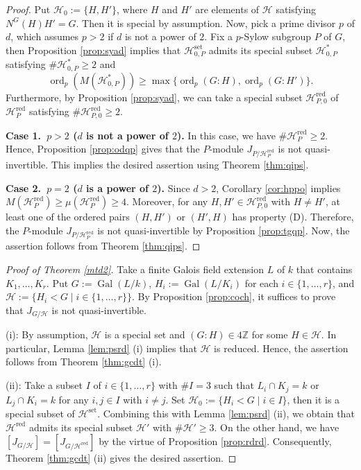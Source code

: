 \documentclass[12pt]{amsart}
\theoremstyle{plain}
\theoremstyle{definition}
\numberwithin{thm}{section}
\numberwithin{equation}{section}
\newcommand{\Z}{\mathbb{Z}}
\newcommand{\cH}{\mathcal{H}}
\DeclareMathOperator{\ord}{ord}
\DeclareMathOperator{\Gal}{Gal}
\DeclareMathOperator{\red}{red}
\DeclareMathOperator{\set}{set}
\begin{document}

\begin{proof}
Put $\cH_{0}:=\{H,H'\}$, where $H$ and $H'$ are elements of $\cH$ satisfying $N^{G}(H)H'=G$. Then it is special by assumption. Now, pick a prime divisor $p$ of $d$, which assumes $p>2$ if $d$ is not a power of $2$. Fix a $p$-Sylow subgroup $P$ of $G$, then Proposition \ref{prop:syad} implies that $\cH_{0,P}^{\set}$ admits its special subset $\cH_{0,P}^{\ast}$ satisfying $\#\cH_{0,P}^{\ast}\geq 2$ and 
\begin{equation*}
    \ord_{p}(M(\cH_{0,P}^{\ast}))\geq \max\{\ord_{p}(G:H),\ord_{p}(G:H')\}. 
\end{equation*}
Furthermore, by Proposition \ref{prop:syad}, we can take a special subset $\cH_{P,0}^{\red}$ of $\cH_{P}^{\red}$ satisfying $\#\cH_{P,0}^{\red}\geq 2$. 

\textbf{Case 1.~$p>2$ ($d$ is not a power of $2$).}
In this case, we have $\#\cH_{P}^{\red}\geq 2$. Hence, Proposition \ref{prop:odqp} gives that the $P$-module $J_{P/\cH_{P}^{\red}}$ is not quasi-invertible. This implies the desired assertion using Theorem \ref{thm:qips}. 

\textbf{Case 2.~$p=2$ ($d$ is a power of $2$). }
Since $d>2$, Corollary \ref{cor:hppo} implies $M(\cH_{P}^{\red})\geq \mu(\cH_{P}^{\red})\geq 4$. Moreover, for any $H,H'\in \cH_{P,0}^{\red}$ with $H\neq H'$, at least one of the ordered pairs $(H,H')$ or $(H',H)$ has property (D). Therefore, the $P$-module $J_{P/\cH_{P}^{\red}}$ is not quasi-invertible by Proposition \ref{prop:tgqp}. Now, the assertion follows from Theorem \ref{thm:qips}. 
\end{proof}

\begin{proof}[Proof of Theorem \ref{mtd2}]
Take a finite Galois field extension $L$ of $k$ that contains $K_{1},\ldots,K_{r}$. Put $G:=\Gal(L/k)$, $H_{i}:=\Gal(L/K_{i})$ for each $i\in \{1,\ldots,r\}$, and $\cH:=\{H_{i}<G\mid i\in \{1,\ldots,r\}\}$. By Proposition \ref{prop:coch}, it suffices to prove that $J_{G/\cH}$ is not quasi-invertible. 

(i): By assumption, $\cH$ is a special set and $(G:H)\in 4\Z$ for some $H\in \cH$. In particular, Lemma \ref{lem:psrd} (i) implies that $\cH$ is reduced. Hence, the assertion follows from Theorem \ref{thm:gcdt} (i). 

(ii): Take a subset $I$ of $i\in \{1,\ldots,r\}$ with $\#I=3$ such that $L_{i}\cap K_{j}=k$ or $L_{j}\cap K_{i}=k$ for any $i,j\in I$ with $i\neq j$. Set $\cH_{0}:=\{H_{i}<G\mid i\in I\}$, then it is a special subset of $\cH^{\set}$. Combining this with Lemma \ref{lem:psrd} (ii), we obtain that $\cH^{\red}$ admits its special subset $\cH'$ with $\#\cH'\geq 3$. On the other hand, we have $[J_{G/\cH}]=[J_{G/\cH^{\red}}]$ by the virtue of Proposition \ref{prop:rdrd}. Consequently, Theorem \ref{thm:gcdt} (ii) gives the desired assertion. 
\end{proof}
\end{document}

